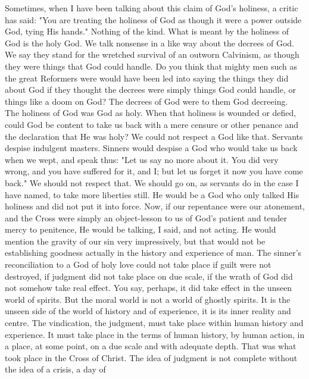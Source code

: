 \documentclass[12pt,a5paper,twoside,titlepage]{book}
\begin{document}
Sometimes, when I have been talking about 
this claim of God's holiness, a critic has said: 
"You are treating the holiness of God as 
though it were a power outside God, tying 
His hands." Nothing of the kind. What is 
meant by the holiness of God is the holy 
God. We talk nonsense in a like way about 
the decrees of God. We say they stand for 
the wretched survival of an outworn Calvinism, 
as though they were things that God 
could handle. Do you think that mighty men 
such as the great Reformers were would have 
been led into saying the things they did about 
God if they thought the decrees were simply 
things God could handle, or things like a doom 
on God? The decrees of God were to them God 
decreeing. The holiness of God was God as holy. 
When that holiness is wounded or defied, could 
God be content to take us back with a mere 
censure or other penance and the declaration 
that He was holy? We could not respect a God 
like that. Servants despise indulgent masters. 
Sinners would despise a God who would take us 
back when we wept, and speak thus: "Let us 
say no more about it. You did very wrong, and 
you have suffered for it, and I; but let us forget 
it now you have come back." We should not 
respect that. We should go on, as servants do in 
the case I have named, to take more liberties 
still. He would be a God who only talked His 
holiness and did not put it into force. Now, if 
our repentance were our atonement, and the 
Cross were simply an object-lesson to us of 
God's patient and tender mercy to penitence, 
He would be talking, I said, and not acting. He 
would mention the gravity of our sin very impressively, 
but that would not be establishing 
goodness actually in the history and experience 
of man. The sinner's reconciliation to a God 
of holy love could not take place if guilt 
were not destroyed, if judgment did not take 
place on due scale, if the wrath of God did 
not somehow take real effect. You say, perhaps, 
it did take effect in the unseen world 
of spirits. But the moral world is not a world 
of ghostly spirits. It is the unseen side of the 
world of history and of experience, it is its 
inner reality and centre. The vindication, the 
judgment, must take place within human history 
and experience. It must take place in the 
terms of human history, by human action, in a 
place, at some point, on a due scale and with adequate 
depth. That was what took place in the 
Cross of Christ. The idea of judgment is not 
complete without the idea of a crisis, a day of 
\end{document}
